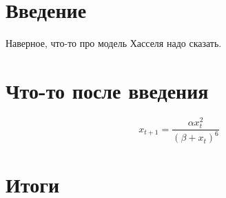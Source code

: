 \section{Введение}

    Наверное, что-то про модель Хасселя надо сказать.

\section{Что-то после введения}

    \[x_{t+1} = \frac{\alpha x_t^2}{(\beta + x_t)^6}\]

\section{Итоги}